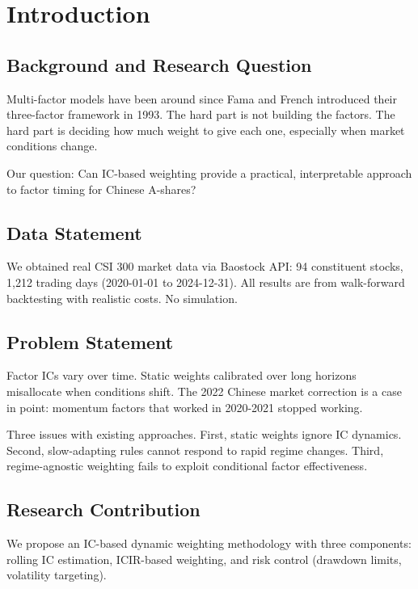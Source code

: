 \section{Introduction}
\label{sec:introduction}

\subsection{Background and Research Question}

Multi-factor models have been around since Fama and French introduced their three-factor framework in 1993. The hard part is not building the factors. The hard part is deciding how much weight to give each one, especially when market conditions change.

Our question: Can IC-based weighting provide a practical, interpretable approach to factor timing for Chinese A-shares?

\subsection{Data Statement}

We obtained real CSI 300 market data via Baostock API: 94 constituent stocks, 1,212 trading days (2020-01-01 to 2024-12-31). All results are from walk-forward backtesting with realistic costs. No simulation.

\subsection{Problem Statement}

Factor ICs vary over time. Static weights calibrated over long horizons misallocate when conditions shift. The 2022 Chinese market correction is a case in point: momentum factors that worked in 2020-2021 stopped working.

Three issues with existing approaches. First, static weights ignore IC dynamics. Second, slow-adapting rules cannot respond to rapid regime changes. Third, regime-agnostic weighting fails to exploit conditional factor effectiveness.

\subsection{Research Contribution}

We propose an IC-based dynamic weighting methodology with three components: rolling IC estimation, ICIR-based weighting, and risk control (drawdown limits, volatility targeting).

